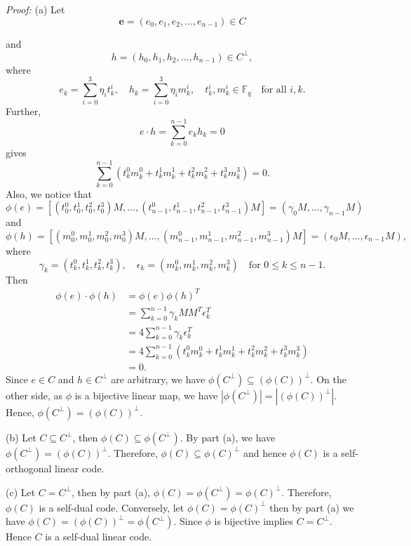 \documentclass[12pt]{article}
\begin{document}
\textit{Proof:} (a) Let
\begin{equation}
\mathbf{e} = (e_0, e_1, e_2, \ldots, e_{n-1}) \in C
\end{equation}

\noindent and
\[
    h = (h_0, h_1, h_2, \ldots, h_{n-1}) \in C^{\perp},
\]
where
\[
    e_k = \sum_{i=0}^3 \eta_i t_k^i, \quad h_k = \sum_{i=0}^3 \eta_i m_k^i, \quad t_k^i, m_k^i \in \mathbb{F}_q \quad \text{for all } i, k.
\]
Further,
\[
    e \cdot h = \sum_{k=0}^{n-1} e_k h_k = 0
\]
gives
\[
    \sum_{k=0}^{n-1} \left( t_k^0 m_k^0 + t_k^1 m_k^1 + t_k^2 m_k^2 + t_k^3 m_k^3 \right) = 0.
\]
Also, we notice that
\[
    \phi(e) = [(t_0^0, t_0^1, t_0^2, t_0^3)M, \ldots, (t_{n-1}^0, t_{n-1}^1, t_{n-1}^2, t_{n-1}^3)M] = (\gamma_0 M, \ldots, \gamma_{n-1} M)
\]
and
\[
    \phi(h) = [(m_0^0, m_0^1, m_0^2, m_0^3)M, \ldots, (m_{n-1}^0, m_{n-1}^1, m_{n-1}^2, m_{n-1}^3)M] = (\epsilon_0 M, \ldots, \epsilon_{n-1} M),
\]
where
\[
    \gamma_k = (t_k^0, t_k^1, t_k^2, t_k^3), \quad \epsilon_k = (m_k^0, m_k^1, m_k^2, m_k^3) \quad \text{for } 0 \leq k \leq n-1.
\]
Then
\begin{align*}
    \phi(e) \cdot \phi(h) &= \phi(e) \phi(h)^T \\
    &= \sum_{k=0}^{n-1} \gamma_k M M^T \epsilon_k^T \\
    &= 4 \sum_{k=0}^{n-1} \gamma_k \epsilon_k^T \\
    &= 4 \sum_{k=0}^{n-1} \left( t_k^0 m_k^0 + t_k^1 m_k^1 + t_k^2 m_k^2 + t_k^3 m_k^3 \right) \\
    &= 0.
\end{align*}
Since $e \in C$ and $h \in C^{\perp}$ are arbitrary, we have $\phi(C^{\perp}) \subseteq (\phi(C))^{\perp}$. On the other side, as $\phi$ is a bijective linear map, we have $|\phi(C^{\perp})| = |(\phi(C))^{\perp}|$. Hence, $\phi(C^{\perp}) = (\phi(C))^{\perp}$.

\noindent (b) Let $C \subseteq C^{\perp}$, then $\phi(C) \subseteq \phi(C^{\perp})$. By part (a), we have $\phi(C^{\perp}) = (\phi(C))^{\perp}$. Therefore, $\phi(C) \subseteq \phi(C)^{\perp}$ and hence $\phi(C)$ is a self-orthogonal linear code.

\noindent (c) Let $C = C^{\perp}$, then by part (a), $\phi(C) = \phi(C^{\perp}) = \phi(C)^{\perp}$. Therefore, $\phi(C)$ is a self-dual code. Conversely, let $\phi(C) = \phi(C)^{\perp}$ then by part (a) we have $\phi(C) = (\phi(C))^{\perp} = \phi(C^{\perp})$. Since $\phi$ is bijective implies $C = C^{\perp}$. Hence $C$ is a self-dual linear code.
\end{document}
